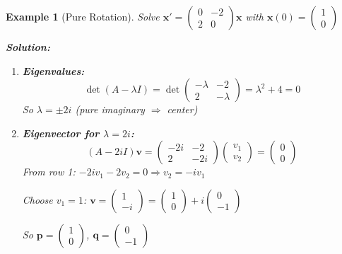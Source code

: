 \documentclass[12pt]{article}
\newtheorem{example}{Example}
\begin{document}
\begin{example}[Pure Rotation]
Solve $\mathbf{x}' = \begin{pmatrix} 0 & -2 \\ 2 & 0 \end{pmatrix}\mathbf{x}$ with $\mathbf{x}(0) = \begin{pmatrix} 1 \\ 0 \end{pmatrix}$

\textbf{Solution:}
\begin{enumerate}
\item \textbf{Eigenvalues:}
\[\det(A - \lambda I) = \det\begin{pmatrix} -\lambda & -2 \\ 2 & -\lambda \end{pmatrix} = \lambda^{2} + 4 = 0\]
So $\lambda = \pm 2i$ (pure imaginary $\Rightarrow$ center)

\item \textbf{Eigenvector for $\lambda = 2i$:}
\[(A - 2iI)\mathbf{v} = \begin{pmatrix} -2i & -2 \\ 2 & -2i \end{pmatrix}\begin{pmatrix} v_{1} \\ v_{2} \end{pmatrix} = \begin{pmatrix} 0 \\ 0 \end{pmatrix}\]
From row 1: $-2iv_{1} - 2v_{2} = 0 \Rightarrow v_{2} = -iv_{1}$

Choose $v_{1} = 1$: $\mathbf{v} = \begin{pmatrix} 1 \\ -i \end{pmatrix} = \begin{pmatrix} 1 \\ 0 \end{pmatrix} + i\begin{pmatrix} 0 \\ -1 \end{pmatrix}$

So $\mathbf{p} = \begin{pmatrix} 1 \\ 0 \end{pmatrix}$, $\mathbf{q} = \begin{pmatrix} 0 \\ -1 \end{pmatrix}$


\end{enumerate}
\end{example}
\end{document}
